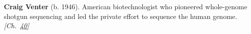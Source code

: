 \textbf{Craig Venter} (b. 1946). American biotechnologist who pioneered whole-genome shotgun sequencing and led the private effort to sequence the human genome. \emph{[Ch.~\hyperref[ch:dnasequencing]{40}]}

